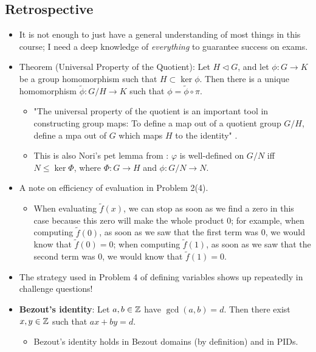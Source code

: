 \documentclass[../notes.tex]{subfiles}
\begin{document}
\subsection*{Retrospective}
\begin{itemize}
    \item It is not enough to just have a general understanding of most things in this course; I need a deep knowledge of \emph{everything} to guarantee success on exams.
    \item Theorem (Universal Property of the Quotient): Let $H\triangleleft G$, and let $\phi:G\to K$ be a group homomorphism such that $H\subset\ker\phi$. Then there is a unique homomorphism $\tilde{\phi}:G/H\to K$ such that $\phi=\tilde{\phi}\circ\pi$.
    \begin{itemize}
        \item "The universal property of the quotient is an important tool in constructing group maps: To define a map out of a quotient group $G/H$, define a mpa out of $G$ which maps $H$ to the identity" \parencite[2]{bib:UniversalQuotient}.
        \item This is also Nori's pet lemma from \textcite[100]{bib:DummitFoote}: $\varphi$ is well-defined on $G/N$ iff $N\leq\ker\Phi$, where $\Phi:G\to H$ and $\phi:G/N\to N$.
    \end{itemize}
    \item A note on efficiency of evaluation in Problem 2(4).
    \begin{itemize}
        \item When evaluating $\tilde{f}(x)$, we can stop as soon as we find a zero in this case because this zero will make the whole product 0; for example, when computing $\tilde{f}(0)$, as soon as we saw that the first term was 0, we would know that $\tilde{f}(0)=0$; when computing $\tilde{f}(1)$, as soon as we saw that the second term was 0, we would know that $\tilde{f}(1)=0$.
    \end{itemize}
    \item The strategy used in Problem 4 of defining variables shows up repeatedly in challenge questions!
    \item \textbf{Bezout's identity}: Let $a,b\in\mathbb{Z}$ have $\gcd(a,b)=d$. Then there exist $x,y\in\mathbb{Z}$ such that $ax+by=d$.
    \begin{itemize}
        \item Bezout's identity holds in Bezout domains (by definition) and in PIDs.
    \end{itemize}
\end{itemize}
\end{document}

